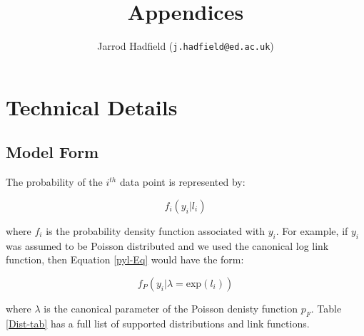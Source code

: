 \documentclass{article}
\title{Appendices}
\author{Jarrod Hadfield (\texttt{j.hadfield@ed.ac.uk})}
\begin{document}
\maketitle
\else
\chapter{Technical Details}
\label{chap7}
\fi




\section{Model Form}
The probability of the $i^{th}$ data point is represented by:

\begin{equation}
f_{i}(y_{i} | l_{i})
\label{pyl-Eq}
\end{equation}

where $f_{i}$ is the probability density function associated with $y_{i}$. For example, if $y_{i}$ was assumed to be Poisson distributed and we used the canonical log link function, then Equation \ref{pyl-Eq} would have the form:

\begin{equation}
f_{P}\left(y_{i} | \lambda = \textrm{exp}(l_{i})\right)
\label{pyl2-Eq}
\end{equation}

where $\lambda$ is the canonical parameter of the Poisson denisty function $p_{F}$. Table \ref{Dist-tab} has a full list of supported distributions and link functions.\\
\end{document}
